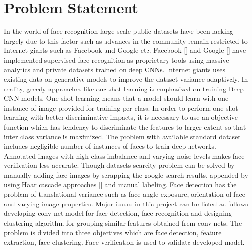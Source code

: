 \documentclass[a4paper,12pt, twoside]{NITKReport}
\begin{document}
\section{Problem Statement}
\label{prob}
	 In the world of face recognition large scale public datasets have been lacking largely due to this factor such as advances in the community remain restricted to Internet giants such as Facebook and Google etc. Facebook [\cite{1}] and Google [\cite{2}] have implemented supervised face recognition as proprietary tools using massive analytics and private datasets trained on deep CNNs. Internet giants uses existing data on generative models to improve the dataset variance adaptively. In reality, greedy approaches like one shot learning is emphasized on training Deep CNN models. One shot learning means that a model should learn with one instance of image provided for training per class. In order to perform one shot learning with better discriminative impacts, it is necessary to use an objective function which has tendency to discriminate the features to larger extent so that inter class variance is maximized. The problem with available standard dataset includes negligible number of instances of faces to train deep networks. Annotated images with high class imbalance and varying noise levels makes face verification less accurate. Though datasets scarcity problem can be solved by manually adding face images by scrapping the google search results, appended by using Haar cascade approaches [\cite{viola2001rapid}] and manual labeling. Face detection has the problem of translational variance such as face angle exposure, orientation of face and varying image properties. Major issues in this project can be listed as follows developing conv-net model for face detection, face recognition and designing clustering algorithm for grouping similar features obtained from conv-nets. The problem is divided into three objectives which are face detection, feature extraction, face clustering. Face verification is used to validate developed model.
		
\end{document}

